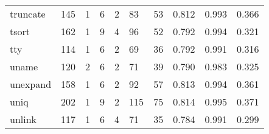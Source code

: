 \begin{longtable}{lp{1.3cm}p{1.3cm}p{1.3cm}p{1.3cm}p{1.3cm}p{1.3cm}p{1.3cm}p{1.3cm}p{1.3cm}}
truncate  &                    145 &                                  1 &                                 6 &                                2 &                                83 &                              53 &                                   0.812 &                                  0.993 &                                0.366 \\
tsort     &                    162 &                                  1 &                                 9 &                                4 &                                96 &                              52 &                                   0.792 &                                  0.994 &                                0.321 \\
tty       &                    114 &                                  1 &                                 6 &                                2 &                                69 &                              36 &                                   0.792 &                                  0.991 &                                0.316 \\
uname     &                    120 &                                  2 &                                 6 &                                2 &                                71 &                              39 &                                   0.790 &                                  0.983 &                                0.325 \\
unexpand  &                    158 &                                  1 &                                 6 &                                2 &                                92 &                              57 &                                   0.813 &                                  0.994 &                                0.361 \\
uniq      &                    202 &                                  1 &                                 9 &                                2 &                               115 &                              75 &                                   0.814 &                                  0.995 &                                0.371 \\
unlink    &                    117 &                                  1 &                                 6 &                                4 &                                71 &                              35 &                                   0.784 &                                  0.991 &                                0.299 \\

\end{longtable}
